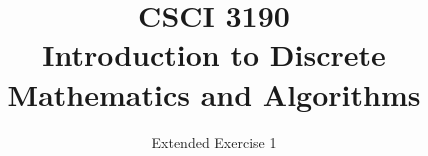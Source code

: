 \documentclass{sig-alternate-05-2015}
\begin{document}






%

\title{CSCI 3190 \\ Introduction to Discrete Mathematics and Algorithms}
\subtitle{Extended Exercise 1}

\maketitle
\begin{abstract}

\end{abstract}

\keywords{}
\end{document}
